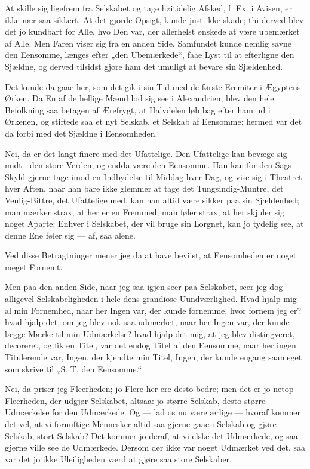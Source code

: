 \documentclass[12pt,a4paper]{book}
\newcommand{\apage}[1]{\marginnote{\footnotesize\textit{[#1]}}}
\begin{document}
At skille sig ligefrem fra Selskabet og tage høitidelig Afsked, f. Ex. i Avisen, er ikke nær saa sikkert. At det gjorde Opsigt, kunde just ikke skade; thi derved blev det jo kundbart for Alle, hvo Den var, der allerhelst ønskede at være ubemærket af Alle. Men Faren viser sig fra en anden Side. Samfundet kunde nemlig savne den Eensomme, længes efter „den Ubemærkede“, faae Lyst til at efterligne den Sjældne, og derved tilsidst gjøre ham det umuligt at bevare sin Sjældenhed.

Det kunde da gaae her, som det gik i sin Tid med de første Eremiter i Ægyptens Ørken. Da En af de hellige Mænd lod sig see i Alexandrien, blev den hele Befolkning saa betagen af Ærefrygt, at Halvdelen løb bag efter ham ud i Ørkenen, og stiftede saa et nyt Selskab, et Selskab af Eensomme: hermed var det da forbi med det Sjældne i Eensomheden.
 \apage{46}

Nei, da er det langt finere med det Ufattelige. Den Ufattelige kan bevæge sig midt i den store Verden, og endda være den Eensomme. Han kan for den Sags Skyld gjerne tage imod en Indbydelse til Middag hver Dag, og vise sig i Theatret hver Aften, naar han bare ikke glemmer at tage det Tungsindig-Muntre, det Venlig-Bittre, det Ufattelige med, kan han altid være sikker paa sin Sjældenhed; man mærker strax, at her er en Fremmed; man føler strax, at her skjuler sig noget Aparte; Enhver i Selskabet, der vil bruge sin Lorgnet, kan jo tydelig see, at denne Ene føler sig --- af, saa alene.

Ved disse Betragtninger mener jeg da at have beviist, at Eensomheden er noget meget Fornemt.

Men paa den anden Side, naar jeg saa igjen seer paa Selskabet, seer jeg dog alligevel Selskabeligheden i hele dens grandiose Uundværlighed. Hvad hjalp mig al min Fornemhed, naar her Ingen var, der kunde fornemme, hvor fornem jeg er? hvad hjalp det, om jeg blev nok saa udmærket, naar her Ingen var, der kunde lægge Mærke til min Udmærkelse? hvad hjalp det mig, at jeg blev distingveret, decoreret, og fik en Titel, var det endog Titel af den Eensomme, naar her ingen Titulerende var, Ingen, der kjendte min Titel, Ingen, der kunde engang saameget som skrive til „S. T. den Eensomme.“

Nei, da priser jeg Fleerheden; jo Flere her ere desto bedre; men det er jo netop Fleerheden, der udgjør Selskabet, altsaa: jo større Selskab, desto større Udmærkelse for den Udmærkede. Og --- lad os nu være ærlige --- hvoraf kommer det vel, at vi fornuftige Mennesker altid saa gjerne gaae i Selskab og gjøre Selskab, stort Selskab? Det kommer jo deraf, at vi elske det Udmærkede, og saa gjerne ville see de Udmærkede. Dersom der ikke var noget Udmærket ved det, saa var det jo ikke Uleiligheden værd at gjøre saa store Selskaber.
\end{document}
